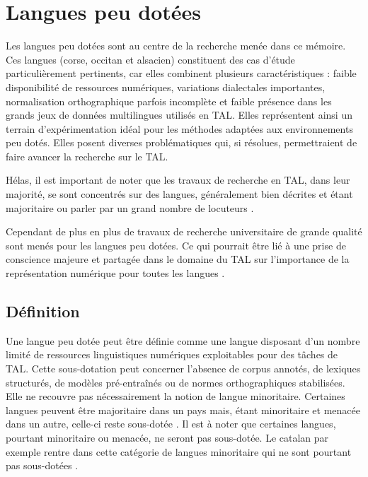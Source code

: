 \chapter{Langues peu dotées}

Les langues peu dotées sont au centre de la recherche menée dans ce mémoire. Ces langues (corse,
occitan et alsacien) constituent des cas d’étude particulièrement pertinents, car elles combinent
plusieurs caractéristiques{ :} faible disponibilité de ressources numériques, variations dialectales
importantes, normalisation orthographique parfois incomplète et faible présence dans les grands
jeux de données multilingues utilisés en TAL. Elles représentent ainsi un terrain d’expérimentation
idéal pour les méthodes adaptées aux environnements peu dotés. Elles posent
diverses problématiques qui, si résolues, permettraient de faire avancer la recherche sur le TAL.

Hélas, il est important de noter que les travaux de recherche en TAL, dans leur majorité, se sont concentrés
sur des langues, généralement bien décrites et étant majoritaire ou parler par un grand nombre de locuteurs \citep{delgratta_2014, bernhard_2018}.

Cependant de plus en plus de travaux de recherche universitaire de grande qualité sont menés
pour les langues peu dotées. Ce qui pourrait être lié à une prise de conscience majeure et partagée dans le domaine du TAL
sur l’importance de la représentation numérique pour toutes les langues \citep{bernhard_2018}.

\section{Définition}

Une langue peu dotée peut être définie comme une langue disposant d’un nombre limité de ressources
linguistiques numériques exploitables pour des tâches de TAL. Cette sous-dotation peut concerner l’absence
de corpus annotés, de lexiques structurés, de modèles pré-entraînés ou de normes orthographiques stabilisées.
Elle ne recouvre pas nécessairement la notion de langue minoritaire. Certaines langues peuvent être
majoritaire dans un pays mais, étant minoritaire et menacée dans un autre, celle-ci reste sous-dotée \citep{gerken_2022}.
Il est à noter que certaines langues, pourtant minoritaire ou menacée, ne seront pas sous-dotée. Le catalan par exemple
rentre dans cette catégorie de langues minoritaire qui ne sont pourtant pas sous-dotées \citep{bernhard_2018}.


